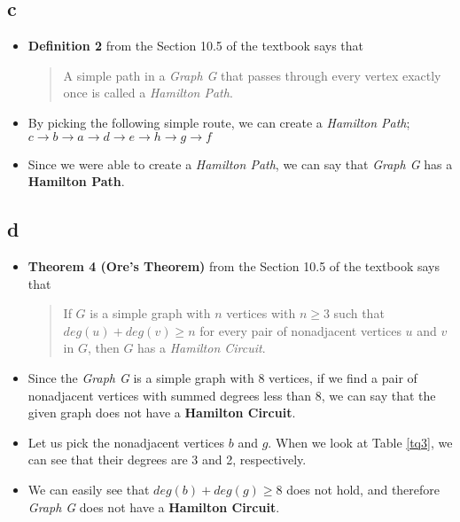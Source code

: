 \documentclass[11pt]{article}
\begin{document}
\subsection*{c}

\begin{itemize}
    \item  \textbf{Definition 2} from the Section 10.5 of the textbook says that 
    \begin{quote}
        A simple path in a \textit{Graph G} that passes through every vertex exactly once is called a \textit{Hamilton Path}.
    \end{quote}
    
    \item By picking the following simple route, we can create a \textit{Hamilton Path};
    \subitem $ c \rightarrow b \rightarrow a \rightarrow d \rightarrow e \rightarrow h \rightarrow g \rightarrow f $
    \item Since we  were able to create a \textit{Hamilton Path}, we can say that \textit{Graph G} has a \textbf{Hamilton Path}. 
\end{itemize}

\subsection*{d}
\begin{itemize}
    \item  \textbf{Theorem 4 (Ore's Theorem)} from the Section 10.5 of the textbook says that 
    \begin{quote}
        If $G$ is a simple graph with $n$ vertices with $n \geq 3$ such that
$deg(u) + deg(v) \geq n$ for every pair of nonadjacent vertices $u$ and $v$ in $G$, then $G$ has a \textit{Hamilton Circuit}.
    \end{quote}
    \item Since the \textit{Graph G} is a simple graph with 8 vertices, if we find a pair of nonadjacent vertices with summed degrees less than 8, we can say that the given graph does not have a \textbf{Hamilton Circuit}. 
    \item Let us pick the nonadjacent vertices $b$ and $g$. When we look at Table \ref{tq3}, we can see that their degrees are 3 and 2, respectively. 
    \item We can easily see that $deg(b) + deg(g) \geq 8$ does not hold, and therefore  \textit{Graph G} does not have a \textbf{Hamilton Circuit}. 
\end{itemize}
\end{document}
